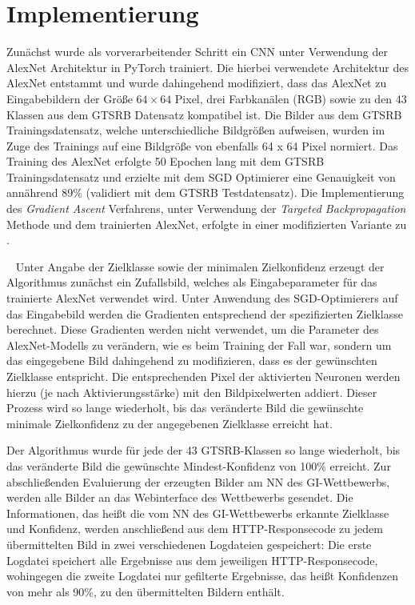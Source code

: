 \section{Implementierung}

Zunächst wurde als vorverarbeitender Schritt ein \ac{CNN} unter Verwendung der AlexNet Architektur in PyTorch trainiert. 
Die hierbei verwendete Architektur des AlexNet entstammt \cite{pytorch_datasets_2019} und wurde dahingehend modifiziert, dass das AlexNet zu Eingabebildern der Größe $64 \times 64$ Pixel, drei Farbkanälen (RGB) sowie zu den 43 Klassen aus dem \ac{GTSRB} Datensatz kompatibel ist. 
Die Bilder aus dem \ac{GTSRB} Trainingsdatensatz, welche unterschiedliche Bildgrößen aufweisen, wurden im Zuge des Trainings auf eine Bildgröße von ebenfalls 64 x 64 Pixel normiert. 
Das Training des AlexNet erfolgte 50 Epochen lang mit dem \ac{GTSRB} Trainingsdatensatz und erzielte mit dem \ac{SGD} Optimierer eine Genauigkeit von annährend 89\% (validiert mit dem \ac{GTSRB} Testdatensatz).
Die Implementierung des \textit{Gradient Ascent} Verfahrens, unter Verwendung der \textit{Targeted Backpropagation} Methode und dem trainierten AlexNet, erfolgte in einer modifizierten Variante zu \cite{ozbulak_pytorch_2019}. 

~\newline
Unter Angabe der Zielklasse sowie der minimalen Zielkonfidenz erzeugt der Algorithmus zunächst ein Zufallsbild, welches als Eingabeparameter für das trainierte AlexNet verwendet wird. Unter Anwendung des SGD-Optimierers auf das Eingabebild werden die Gradienten entsprechend der spezifizierten Zielklasse berechnet. 
Diese Gradienten werden nicht verwendet, um die Parameter des AlexNet-Modells zu verändern, wie es beim Training der Fall war, sondern um das eingegebene Bild dahingehend zu modifizieren, dass es der gewünschten Zielklasse entspricht. 
Die entsprechenden Pixel der aktivierten Neuronen werden hierzu (je nach Aktivierungsstärke) mit den Bildpixelwerten addiert. 
Dieser Prozess wird so lange wiederholt, bis das veränderte Bild die gewünschte minimale Zielkonfidenz zu der angegebenen Zielklasse erreicht hat.
~\newline

Der Algorithmus wurde für jede der 43 \ac{GTSRB}-Klassen so lange wiederholt, bis das veränderte Bild die gewünschte Mindest-Konfidenz von 100\% erreicht.
Zur abschließenden Evaluierung der erzeugten Bilder am \ac{NN} des \ac{GI}-Wettbewerbs, werden alle Bilder an das Webinterface des Wettbewerbs gesendet. Die Informationen, das heißt die vom \ac{NN} des \ac{GI}-Wettbewerbs erkannte Zielklasse und Konfidenz, werden anschließend aus dem HTTP-Responsecode zu jedem übermittelten Bild in zwei verschiedenen Logdateien gespeichert: Die erste Logdatei speichert alle Ergebnisse aus dem jeweiligen HTTP-Responsecode, wohingegen die zweite Logdatei nur gefilterte Ergebnisse, das heißt Konfidenzen von mehr als 90\%, zu den übermittelten Bildern enthält.




